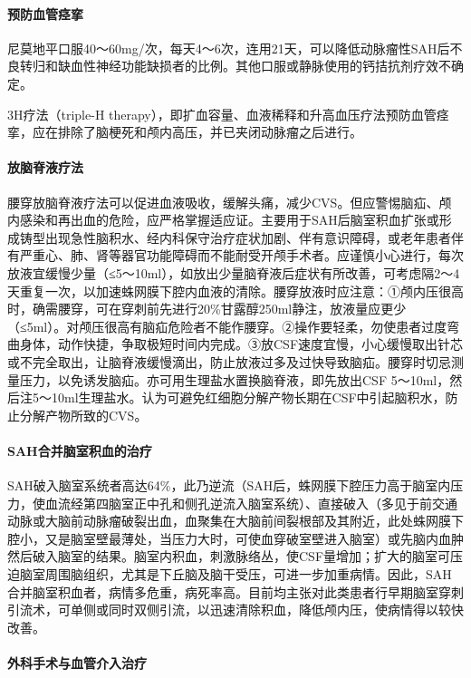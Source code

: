 \paragraph{预防血管痉挛}

尼莫地平口服40～60mg/次，每天4～6次，连用21天，可以降低动脉瘤性SAH后不良转归和缺血性神经功能缺损者的比例。其他口服或静脉使用的钙拮抗剂疗效不确定。

3H疗法（triple-H
therapy），即扩血容量、血液稀释和升高血压疗法预防血管痉挛，应在排除了脑梗死和颅内高压，并已夹闭动脉瘤之后进行。

\paragraph{放脑脊液疗法}

腰穿放脑脊液疗法可以促进血液吸收，缓解头痛，减少CVS。但应警惕脑疝、颅内感染和再出血的危险，应严格掌握适应证。主要用于SAH后脑室积血扩张或形成铸型出现急性脑积水、经内科保守治疗症状加剧、伴有意识障碍，或老年患者伴有严重心、肺、肾等器官功能障碍而不能耐受开颅手术者。应谨慎小心进行，每次放液宜缓慢少量（≤5～10ml），如放出少量脑脊液后症状有所改善，可考虑隔2～4天重复一次，以加速蛛网膜下腔内血液的清除。腰穿放液时应注意：①颅内压很高时，确需腰穿，可在穿刺前先进行20\%甘露醇250ml静注，放液量应更少（≤5ml）。对颅压很高有脑疝危险者不能作腰穿。②操作要轻柔，勿使患者过度弯曲身体，动作快捷，争取极短时间内完成。③放CSF速度宜慢，小心缓慢取出针芯或不完全取出，让脑脊液缓慢滴出，防止放液过多及过快导致脑疝。腰穿时切忌测量压力，以免诱发脑疝。亦可用生理盐水置换脑脊液，即先放出CSF
5～10ml，然后注5～10ml生理盐水。认为可避免红细胞分解产物长期在CSF中引起脑积水，防止分解产物所致的CVS。

\paragraph{SAH合并脑室积血的治疗}

SAH破入脑室系统者高达64\%，此乃逆流（SAH后，蛛网膜下腔压力高于脑室内压力，使血流经第四脑室正中孔和侧孔逆流入脑室系统）、直接破入（多见于前交通动脉或大脑前动脉瘤破裂出血，血聚集在大脑前间裂根部及其附近，此处蛛网膜下腔小，又是脑室壁最薄处，当压力大时，可使血穿破室壁进入脑室）或先脑内血肿然后破入脑室的结果。脑室内积血，刺激脉络丛，使CSF量增加；扩大的脑室可压迫脑室周围脑组织，尤其是下丘脑及脑干受压，可进一步加重病情。因此，SAH合并脑室积血者，病情多危重，病死率高。目前均主张对此类患者行早期脑室穿刺引流术，可单侧或同时双侧引流，以迅速清除积血，降低颅内压，使病情得以较快改善。

\paragraph{外科手术与血管介入治疗}


